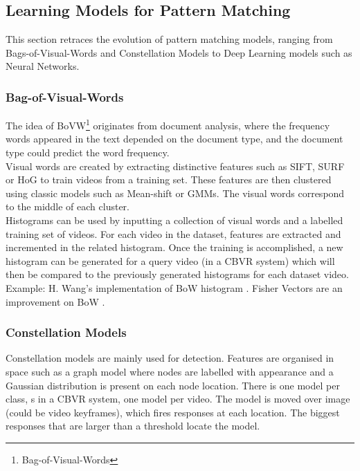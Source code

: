 
\subsection{Learning Models for Pattern Matching}

This section retraces the evolution of pattern matching models, ranging from Bags-of-Visual-Words and Constellation Models to Deep Learning models such as Neural Networks.

\subsubsection{Bag-of-Visual-Words}

The idea of BoVW\footnote{Bag-of-Visual-Words} originates from document analysis, where the frequency words appeared in the text depended on the document type, and the document type could predict the word frequency.\\

Visual words are created by extracting distinctive features such as SIFT, SURF or HoG to train videos from a training set. These features are then clustered using classic models such as Mean-shift or GMMs. The visual words correspond to the middle of each cluster.\\

Histograms can be used by inputting a collection of visual words and a labelled training set of videos. For each video in the dataset, features are extracted and incremented in the related histogram. Once the training is accomplished, a new histogram can be generated for a query video (in a CBVR system) which will then be compared to the previously generated histograms for each dataset video. Example: H. Wang's implementation of BoW histogram \cite{wang2016actionregonition}. Fisher Vectors are an improvement on BoW \cite{araujo2017i2v}.\\

\subsubsection{Constellation Models}

Constellation models are mainly used for detection. Features are organised in space such as a graph model where nodes are labelled with appearance and a Gaussian distribution is present on each node location. There is one model per class, s in a CBVR system, one model per video. The model is moved over image (could be video keyframes), which fires responses at each location. The biggest responses that are larger than a threshold locate the model.

